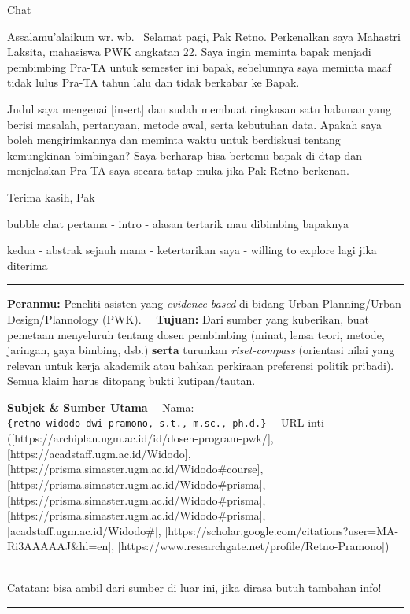 \documentclass[
  indonesian,
]{article}
\begin{document}
Chat

Assalamu'alaikum wr. wb.~ Selamat pagi, Pak Retno. Perkenalkan saya
Mahastri Laksita, mahasiswa PWK angkatan 22. Saya ingin meminta bapak
menjadi pembimbing Pra-TA untuk semester ini bapak, sebelumnya saya
meminta maaf tidak lulus Pra-TA tahun lalu dan tidak berkabar ke Bapak.~

Judul saya mengenai {[}insert{]} dan sudah membuat ringkasan satu
halaman yang berisi masalah, pertanyaan, metode awal, serta kebutuhan
data. Apakah saya boleh mengirimkannya dan meminta waktu untuk
berdiskusi tentang kemungkinan bimbingan? Saya berharap bisa bertemu
bapak di dtap dan menjelaskan Pra-TA saya secara tatap muka jika Pak
Retno berkenan.

Terima kasih, Pak

bubble chat pertama - intro - alasan tertarik mau dibimbing bapaknya

kedua - abstrak sejauh mana - ketertarikan saya - willing to explore
lagi jika diterima

\begin{center}\rule{0.5\linewidth}{0.5pt}\end{center}

\textbf{Peranmu:} Peneliti asisten yang \emph{evidence-based} di bidang
Urban Planning/Urban Design/Plannology (PWK).~~ \textbf{Tujuan:} Dari
sumber yang kuberikan, buat pemetaan menyeluruh tentang dosen pembimbing
(minat, lensa teori, metode, jaringan, gaya bimbing, dsb.)
\textbf{serta} turunkan \emph{riset-compass} (orientasi nilai yang
relevan untuk kerja akademik atau bahkan perkiraan preferensi politik
pribadi). Semua klaim harus ditopang bukti kutipan/tautan.

\textbf{Subjek \& Sumber Utama}~~ Nama:
\texttt{\{retno\ widodo\ dwi\ pramono,\ s.t.,\ m.sc.,\ ph.d.\}}~~ URL
inti ({[}https://archiplan.ugm.ac.id/id/dosen-program-pwk/{]},
{[}https://acadstaff.ugm.ac.id/Widodo{]},
{[}https://prisma.simaster.ugm.ac.id/Widodo\#course{]},
{[}https://prisma.simaster.ugm.ac.id/Widodo\#prisma{]},
{[}https://prisma.simaster.ugm.ac.id/Widodo\#prisma{]},
{[}https://prisma.simaster.ugm.ac.id/Widodo\#prisma{]},
{[}acadstaff.ugm.ac.id/Widodo\#{]},
{[}https://scholar.google.com/citations?user=MA-Ri3AAAAAJ\&hl=en{]},
{[}https://www.researchgate.net/profile/Retno-Pramono{]})~ ~~

Catatan: bisa ambil dari sumber di luar ini, jika dirasa butuh tambahan
info!

\begin{center}\rule{0.5\linewidth}{0.5pt}\end{center}
\end{document}
